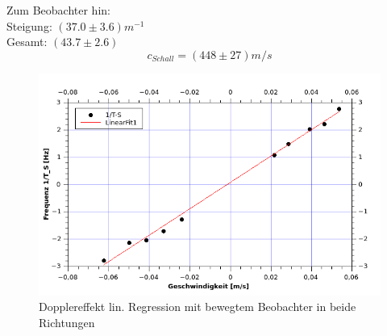 \documentclass[12pt,a4paper]{article}
\begin{document}
\begin{multicols}{2}
\noindent Zum Beobachter hin:\\
Steigung: $(37.0 \pm 3.6) m^{-1}$\\

\noindent Gesamt: $(43.7 \pm 2.6)$
$$c_{Schall} = (448 \pm 27) m/s$$
\end{multicols}
\begin{figure}[H]
	\centering
	\includegraphics[scale=2.3]{./figure/Dopplereffekt.png}
	\caption{Dopplereffekt lin. Regression mit bewegtem Beobachter in beide Richtungen}
	\label{fig:doppler}
\end{figure}
\end{document}
